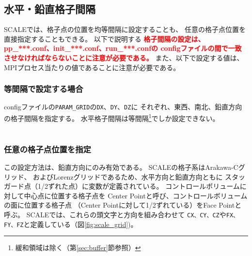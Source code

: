 \subsection{水平・鉛直格子間隔}
\label{sec:gridinterv}
SCALEでは、格子点の位置を均等間隔に設定することも、
任意の格子点位置を直接指定することもできる。
以下で説明する
\textcolor{red}{\bf 格子間隔の設定は、pp\_***.conf、init\_***.conf、run\_***.confの
configファイルの間で一致させなければならないことに注意が必要である。}
また、以下で設定する値は、MPIプロセス当たりの値であることに注意が必要である。


\subsubsection{等間隔で設定する場合}
configファイルの\verb|PARAM_GRID|の\verb|DX|、\verb|DY|、\verb|DZ|に
それぞれ、東西、南北、鉛直方向の格子間隔を指定する。
水平格子間隔は等間隔\footnote{緩和領域は除く（第\ref{sec:buffer}節参照）}でしか設定できない。\\

\\


\subsubsection{任意の格子点位置を指定}
この設定方法は、鉛直方向にのみ有効である。
SCALEの格子系はArakawa-Cグリッド、
およびLorenzグリッドであるため、水平方向と鉛直方向ともに
スタッガード点（1/2ずれた点）に変数が定義されている。
コントロールボリュームに対して中心点に位置する格子点を
Center Pointと呼び、コントロールボリュームの面に位置する格子点
（Center Pointに対して1/2ずれている）をFace Pointと呼ぶ。
SCALEでは、これらの頭文字と方向を組み合わせて
\verb|CX、CY、CZ|や\verb|FX、FY、FZ|と定義している（図\ref{fig:scale_grid})。


